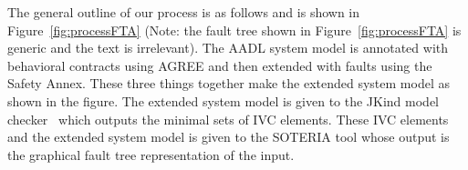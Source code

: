 The general outline of our process is as follows and is shown in Figure~\ref{fig:processFTA} (Note: the fault tree shown in Figure~\ref{fig:processFTA} is generic and the text is irrelevant). The AADL system model is annotated with behavioral contracts using AGREE and then extended with faults using the Safety Annex. These three things together make the extended system model as shown in the figure. The extended system model is given to the JKind model checker~\cite{2017arXiv171201222G} which outputs the minimal sets of IVC elements. These IVC elements and the extended system model is given to the SOTERIA tool whose output is the graphical fault tree representation of the input. 
